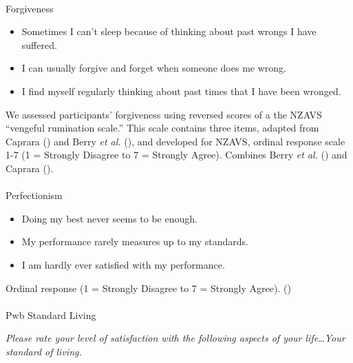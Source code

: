 \documentclass[
  single column]{article}
\makeatletter
\let\oldparagraph\paragraph
\renewcommand{\paragraph}{
    \@ifstar
      \xxxParagraphStar
      \xxxParagraphNoStar
  }
\newcommand{\xxxParagraphStar}[1]{\oldparagraph*{#1}\mbox{}}
\newcommand{\xxxParagraphNoStar}[1]{\oldparagraph{#1}\mbox{}}
\providecommand{\tightlist}{%
  \setlength{\itemsep}{0pt}\setlength{\parskip}{0pt}}\usepackage{longtable,booktabs,array}
\makeatother
\begin{document}
\paragraph{Forgiveness}\label{forgiveness}

\begin{itemize}
\tightlist
\item
  Sometimes I can't sleep because of thinking about past wrongs I have
  suffered.
\item
  I can usually forgive and forget when someone does me wrong.
\item
  I find myself regularly thinking about past times that I have been
  wronged.
\end{itemize}

We assessed participants' forgiveness using reversed scores of a the
NZAVS ``vengeful rumination scale.'' This scale contains three items,
adapted from Caprara () and
Berry \emph{et al.} (), and
developed for NZAVS, ordinal response scale 1-7 (1 = Strongly Disagree
to 7 = Strongly Agree). Combines Berry \emph{et al.}
() and Caprara
().

\paragraph{Perfectionism}\label{perfectionism}

\begin{itemize}
\tightlist
\item
  Doing my best never seems to be enough.
\item
  My performance rarely measures up to my standards.
\item
  I am hardly ever satisfied with my performance.
\end{itemize}

Ordinal response (1 = Strongly Disagree to 7 = Strongly Agree).
()

\paragraph{Pwb Standard Living}\label{pwb-standard-living-1}

\emph{Please rate your level of satisfaction with the following aspects
of your life\ldots Your standard of living.}
\end{document}
